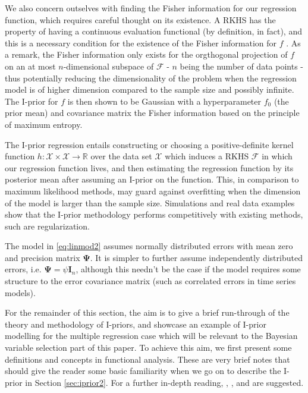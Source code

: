 We also concern outselves with finding the Fisher information for our regression function, which requires careful thought on its existence. A RKHS has the property of having a continuous evaluation functional (by definition, in fact), and this is a necessary condition for the existence of the Fisher information for $f$ \citep{Bergsma2014}. As a remark, the Fisher information only exists for the orgthogonal projection of $f$ on an at most $n$-dimensional subspace of $\mathcal F$ - $n$ being the number of data points - thus potentially reducing the dimensionality of the problem when the regression model is of higher dimension compared to the sample size and possibly infinite. The I-prior for $f$ is then shown to be Gaussian with a hyperparameter $f_0$ (the prior mean) and covariance matrix the Fisher information based on the principle of maximum entropy.

The I-prior regression entails constructing or choosing a positive-definite kernel function $h:\mathcal X \times \mathcal X \rightarrow \mathbb R$ over the data set $\mathcal X$ which induces a RKHS $\mathcal F$ in which our regression function lives, and then estimating the regression function by its posterior mean after assuming an I-prior on the function. This, in comparison to maximum likelihood methods, may guard against overfitting when the dimension of the model is larger than the sample size. Simulations and real data examples show that the I-prior methodology performs competitively with existing methods, such are regularization.

\begin{remark}
	The model in \eqref{eq:linmod2} assumes normally distributed errors with mean zero and precision matrix $\boldsymbol\Psi$. It is simpler to further assume independently distributed errors, i.e. $\boldsymbol\Psi=\psi\mathbf I_n$, although this needn't be the case if the model requires some structure to the error covariance matrix (such as correlated errors in time series models).
\end{remark}

For the remainder of this section, the aim is to give a brief run-through of the theory and methodology of I-priors, and showcase an example of I-prior modelling for the multiple regression case which will be relevant to the Bayesian variable selection part of this paper. To achieve this aim, we first present some definitions and concepts in functional analysis. These are very brief notes that should give the reader some basic familiarity when we go on to describe the I-prior in Section \ref{sec:iprior2}. For a further in-depth reading, \cite{steinwart2008}, \cite{berlinet2011}, and \cite{Sejdinovic2012} are suggested.
